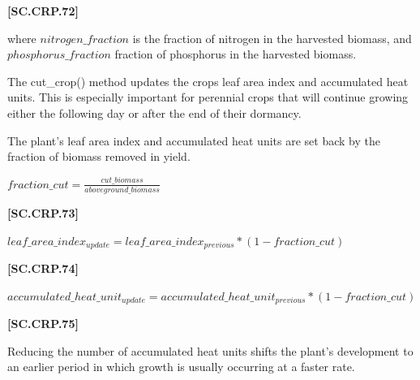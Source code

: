             {\raggedleft \textbf{[SC.CRP.72]}\par}
            \vspace{0.5cm}

where \(nitrogen\_fraction\) is the fraction of nitrogen in the harvested biomass, and \(phosphorus\_fraction\)  fraction of phosphorus in the harvested biomass.

The cut\_crop() method updates the crops leaf area index and accumulated heat units. This is especially important for perennial crops that will continue growing either the following day or after the end of their dormancy. 

The plant’s leaf area index and accumulated heat units are set back by the fraction of biomass removed in yield.
   \vspace{0.2cm}

    \begin{center}
        \(fraction\_cut=\frac{cut\_biomass}{aboveground\_biomass}\)       
    \end{center}
        \vspace{0.5cm}
    
            {\raggedleft \textbf{[SC.CRP.73]}\par}
            \vspace{0.5cm}

    \begin{center}
        \(leaf\_area\_index_{update}=leaf\_area\_index_{previous} * (1-fraction\_cut)\)       
    \end{center}
        \vspace{0.5cm}
    
            {\raggedleft \textbf{[SC.CRP.74]}\par}
            \vspace{0.5cm}

    \begin{center}
        \(accumulated\_heat\_unit_{update}=accumulated\_heat\_unit_{previous} * (1-fraction\_cut)\)       
    \end{center}
        \vspace{0.5cm}
    
            {\raggedleft \textbf{[SC.CRP.75]}\par}
            \vspace{0.5cm}

Reducing the number of accumulated heat units shifts the plant’s development to an earlier period in which growth is usually occurring at a faster rate.

